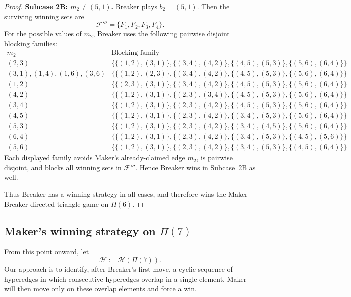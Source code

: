 \documentclass{article}
\theoremstyle{definition}
\theoremstyle{plain}
\theoremstyle{remark}
\theoremstyle{definition}
\begin{document}
\begin{proof}
\smallskip
\noindent\textbf{Subcase 2B: $m_2\neq(5,1)$.}
Breaker plays $b_2=(5,1)$.
Then the surviving winning sets are
\[
\mathcal F'''=\{F_1,F_2,F_3,F_4\}.
\]
For the possible values of $m_2$, Breaker uses the following pairwise disjoint blocking families:
\[
\begin{array}{c|l}
m_2 & \text{Blocking family} \\ \hline
(2,3) & \bigl\{\{(1,2),(3,1)\},\{(3,4),(4,2)\},\{(4,5),(5,3)\},\{(5,6),(6,4)\}\bigr\}\\[1mm]
(3,1),(1,4),(1,6),(3,6) & \bigl\{\{(1,2),(2,3)\},\{(3,4),(4,2)\},\{(4,5),(5,3)\},\{(5,6),(6,4)\}\bigr\}\\[1mm]
(1,2) & \bigl\{\{(2,3),(3,1)\},\{(3,4),(4,2)\},\{(4,5),(5,3)\},\{(5,6),(6,4)\}\bigr\}\\[1mm]
(4,2) & \bigl\{\{(1,2),(3,1)\},\{(2,3),(3,4)\},\{(4,5),(5,3)\},\{(5,6),(6,4)\}\bigr\}\\[1mm]
(3,4) & \bigl\{\{(1,2),(3,1)\},\{(2,3),(4,2)\},\{(4,5),(5,3)\},\{(5,6),(6,4)\}\bigr\}\\[1mm]
(4,5) & \bigl\{\{(1,2),(3,1)\},\{(2,3),(4,2)\},\{(3,4),(5,3)\},\{(5,6),(6,4)\}\bigr\}\\[1mm]
(5,3) & \bigl\{\{(1,2),(3,1)\},\{(2,3),(4,2)\},\{(3,4),(4,5)\},\{(5,6),(6,4)\}\bigr\}\\[1mm]
(6,4) & \bigl\{\{(1,2),(3,1)\},\{(2,3),(4,2)\},\{(3,4),(5,3)\},\{(4,5),(5,6)\}\bigr\}\\[1mm]
(5,6) & \bigl\{\{(1,2),(3,1)\},\{(2,3),(4,2)\},\{(3,4),(5,3)\},\{(4,5),(6,4)\}\bigr\}
\end{array}
\]
Each displayed family avoids Maker's already-claimed edge $m_2$, is pairwise disjoint, and blocks all winning sets in $\mathcal F'''$.
Hence Breaker wins in Subcase~2B as well.

Thus Breaker has a winning strategy in all cases, and therefore wins the Maker-Breaker directed triangle game on $\Pi(6)$.

\end{proof}

\subsection{\texorpdfstring{Maker's winning strategy on $\Pi(7)$}{Maker's winning strategy on Pi(7)}}

From this point onward, let
\[
\mathcal H:=\mathcal H(\Pi(7)).
\]
Our approach is to identify, after Breaker's first move, a cyclic sequence of hyperedges in which consecutive hyperedges overlap in a single element. Maker will then move only on these overlap elements and force a win.
\end{document}
